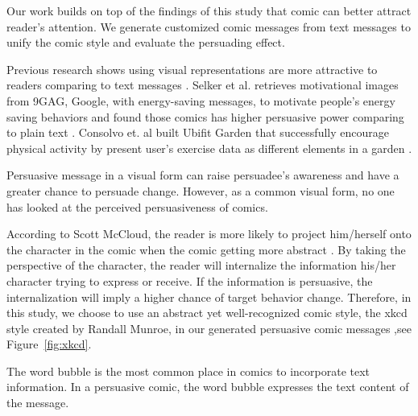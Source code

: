 Our work builds on top of the findings of this study that comic can better attract reader's attention. We generate customized comic messages from text messages to unify the comic style and evaluate the persuading effect.

Previous research shows using visual representations are more attractive to readers comparing to text messages \cite{selker2015sweetbuildinggreeter,consolvo2008activity}. Selker et al. retrieves motivational images from 9GAG, Google, with energy-saving messages, to motivate people's energy saving behaviors and found those comics has higher persuasive power comparing to plain text \cite{selker2015sweetbuildinggreeter}. Consolvo et. al built Ubifit Garden that successfully encourage physical activity by present user's exercise data as different elements in a garden \cite{consolvo2008activity}.

Persuasive message in a visual form can raise persuadee's awareness and have a greater chance to persuade change. However, as a common visual form, no one has looked at the perceived persuasiveness of comics.

According to Scott McCloud, the reader is more likely to project him/herself onto the character in the comic when the comic getting more abstract \cite{scott1993understanding}. By taking the perspective of the character, the reader will internalize the information his/her character trying to express or receive. If the information is persuasive, the internalization will imply a higher chance of target behavior change. Therefore, in this study, we choose to use an abstract yet well-recognized comic style, the xkcd style created by Randall Munroe, in our generated persuasive comic messages \cite{munroe2009xkcd},see Figure~\ref{fig:xkcd}.


The word bubble is the most common place in comics to incorporate text information. In a persuasive comic, the word bubble expresses the text content of the message.

